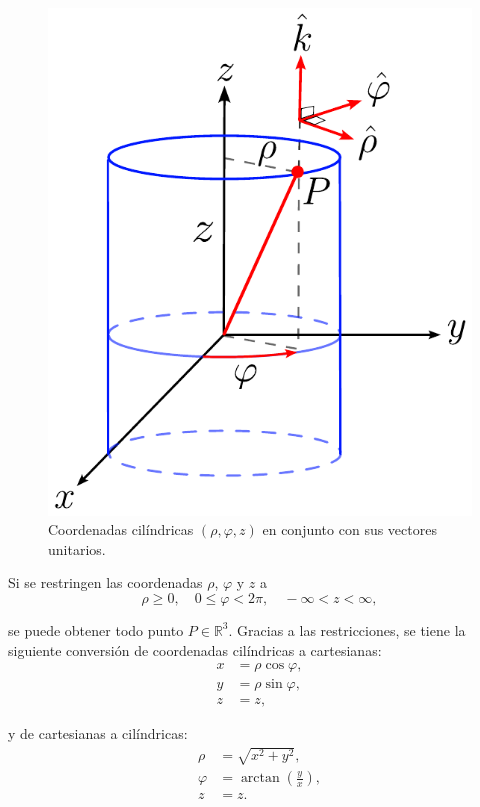 \begin{figure}[H]
    \centering
    \includegraphics[scale = 0.65]{Figuras/Coordenadas-Cilindricas.pdf}
    \caption{Coordenadas cilíndricas $(\rho,\varphi, z)$ en conjunto con sus vectores unitarios.}
    \label{fig:Coordenadas-Cilindricas}
\end{figure}

Si se restringen las coordenadas $\rho$, $\varphi$ y $z$ a
$$\rho \geq 0, \quad 0 \leq \varphi < 2\pi, \quad -\infty < z < \infty,$$

se puede obtener todo punto $P \in \mathbb{R}^3$. Gracias a las restricciones, se tiene la siguiente conversión de coordenadas cilíndricas a cartesianas:
\begin{align*}
    x &= \rho \cos \varphi,\\
    y &= \rho \sin \varphi ,\\
    z &= z,
\end{align*}

y de cartesianas a cilíndricas:
\begin{align*}
    \rho &= \sqrt{x^2+y^2}, \\
    \varphi &= \arctan \left( \frac{y}{x} \right), \\
    z &= z .
\end{align*}

